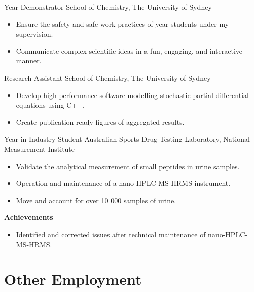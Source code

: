 { Year Demonstrator}
{School of Chemistry, The University of Sydney}
{}{}
{%
    \begin{itemize}
      \item Ensure the safety and safe work practices
        of  year students under my supervision.
      \item Communicate complex scientific ideas
        in a fun, engaging, and interactive manner.
    \end{itemize}
}

{Research Assistant}
{School of Chemistry, The University of Sydney}
{}{}{%
  \begin{itemize}
    \item Develop high performance software modelling stochastic partial differential equations using C++.
    \item Create publication-ready figures of aggregated results.
  \end{itemize}
}
\vspace{1em}

{Year in Industry Student}
{Australian Sports Drug Testing Laboratory, National Measurement Institute}
{}{}
{%
  \begin{itemize}
    \item Validate the analytical measurement of small peptides in urine samples.
    \item Operation and maintenance of a nano-HPLC-MS-HRMS instrument.
    \item Move and account for over 10 000 samples of urine.
  \end{itemize}
  \textbf{Achievements}
  \begin{itemize}
    \item Identified and corrected issues after technical maintenance of nano-HPLC-MS-HRMS.
  \end{itemize}
}
\vspace{1em}

\section{Other Employment}

